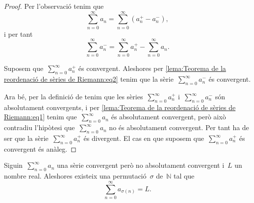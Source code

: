 \documentclass[../../main.tex]{subfiles}
\begin{document}
    \begin{proof}
        Per l'observació  tenim que
        \begin{equation}
            \label{lema:Teorema de la reordenació de sèries de Riemann:eq1}
            \sum_{n=0}^{\infty}a_{n}=\sum_{n=0}^{\infty}\left(a^{+}_{n}-a^{-}_{n}\right),
        \end{equation}
        i per tant
        \begin{equation}
            \label{lema:Teorema de la reordenació de sèries de Riemann:eq2}
            \sum_{n=0}^{\infty}a^{-}_{n}=\sum_{n=0}^{\infty}a^{+}_{n}-\sum_{n=0}^{\infty}a_{n}.
        \end{equation}

        Suposem que~\(\sum_{n=0}^{\infty}a^{+}_{n}\) és convergent.
        Aleshores per \eqref{lema:Teorema de la reordenació de sèries de Riemann:eq2} tenim que la sèrie~\(\sum_{n=0}^{\infty}a^{-}_{n}\) és convergent.

        Ara bé, per la definició de  tenim que les sèries~\(\sum_{n=0}^{\infty}a^{+}_{n}\) i~\(\sum_{n=0}^{\infty}a^{-}_{n}\) són absolutament convergents, i per \eqref{lema:Teorema de la reordenació de sèries de Riemann:eq1} tenim que~\(\sum_{n=0}^{\infty}a_{n}\) és absolutament convergent, però això contradiu l'hipòtesi que~\(\sum_{n=0}^{\infty}a_{n}\) no és absolutament convergent.
        Per tant ha de ser que la sèrie~\(\sum_{n=0}^{\infty}a^{+}_{n}\) és divergent.
        El cas en que suposem que~\(\sum_{n=0}^{\infty}a^{+}_{n}\) és convergent és anàleg.
    \end{proof}
    \begin{theorem}
        \label{thm:Teorema de la reordenació de sèries de Riemann}
        Siguin~\(\sum_{n=0}^{\infty}a_{n}\) una sèrie convergent però no absolutament convergent i~\(L\) un nombre real.
        Aleshores existeix una permutació~\(\sigma\) de~\(\mathbb{N}\) tal que
        \[
            \sum_{n=0}^{\infty}a_{\sigma(n)}=L.
        \]
    \end{theorem}
\end{document}
